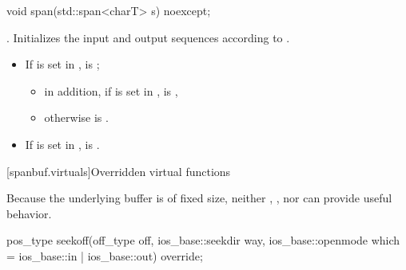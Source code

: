 %
\begin{itemdecl}
void span(std::span<charT> s) noexcept;
\end{itemdecl}

\begin{itemdescr}
\pnum
\effects
{}.
Initializes the input and output sequences according to .

\pnum
\ensures
\begin{itemize}
\item
If  is set in ,
is ;
\begin{itemize}
\item
in addition, if  is set in ,
 is ,
\item
otherwise  is .
\end{itemize}
\item
If  is set in ,
 is .
\end{itemize}
\end{itemdescr}

[spanbuf.virtuals]{Overridden virtual functions}

\pnum
\begin{note}
Because the underlying buffer is of fixed size,
neither , , nor 
can provide useful behavior.
\end{note}

%
\begin{itemdecl}
pos_type seekoff(off_type off, ios_base::seekdir way,
                 ios_base::openmode which = ios_base::in | ios_base::out) override;
\end{itemdecl}


